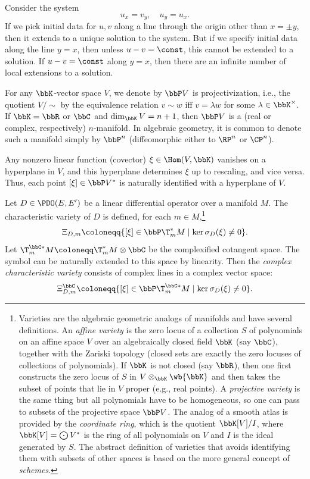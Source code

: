 \begin{example}\label{ex 5.6.1 Ivey}
    Consider the system 
    \[u_x=v_y,\quad u_y=u_x.\label{eq 5.20 Ivey}\]
    If we pick initial data for $u,v$ along a line through the origin other than $x=\pm y$, then it extends to a unique solution to the system. But if we specify initial data along the line $y=x$, then unless $u-v=\const$, this cannot be extended to a solution. If $u-v=\const$ along $y=x$, then there are an infinite number of local extensions to a solution.
\end{example}

For any $\bbK$-vector space $V$, we denote by $\bbP V$ is projectivization, i.e., the quotient $V\slash \sim$ by the equivalence relation $v\sim w$ iff $v=\lambda w$ for some $\lambda\in\bbK^\times$. If $\bbK=\bbR$ or $\bbC$ and $\dim_\bbK V=n+1$, then $\bbP V$ is a (real or complex, respectively) $n$-manifold. In algebraic geometry, it is common to denote such a manifold simply by $\bbP^n$ (diffeomorphic either to $\RP^n$ or $\CP^n$).

Any nonzero linear function (covector) $\xi\in\Hom(V,\bbK)$ vanishes on a hyperplane in $V$, and this hyperplane determines $\xi$ up to rescaling, and vice versa. Thus, each point $[\xi]\in \bbP V^\ast$ is naturally identified with a hyperplane of $V$.

\begin{defn}
    Let $D\in\PDO(E,E')$ be a linear differential operator over a manifold $M$. The characteristic variety of $D$ is defined, for each $m\in M$,\footnote{Varieties are the algebraic geometric analogs of manifolds and have several definitions. An \emph{affine variety} is the zero locus of a collection $S$ of polynomials on an affine space $V$ over an algebraically closed field $\bbK$ (say $\bbC$), together with the Zariski topology (closed sets are exactly the zero locuses of collections of polynomials). If $\bbK$ is not closed (say $\bbR$), then one first constructs the zero locus of $S$ in $V\otimes_{\bbK} \wb{\bbK}$ and then takes the subset of points that lie in $V$ proper (e.g., real points). A \emph{projective variety} is the same thing but all polynomials have to be homogeneous, so one can pass to subsets of the projective space $\bbP V$. The analog of a smooth atlas is provided by the \emph{coordinate ring}, which is the quotient $\bbK[V]\slash I$, where $\bbK[V]=\bigodot V^\ast$ is the ring of all polynomials on $V$ and $I$ is the ideal generated by $S$. The abstract definition of varieties that avoids identifying them with subsets of other spaces is based on the more general concept of \emph{schemes}.}
    \[\Xi_{D,m}\coloneqq \{[\xi]\in \bbP \T^\ast_m M\mid \ker\sigma_D(\xi)\neq 0\}.\]
    Let $\T^{\bbC\ast}_m M\coloneqq \T_m^\ast M\otimes\bbC$ be the complexified cotangent space. The symbol can be naturally extended to this space by linearity. Then the \emph{complex characteristic variety} consists of complex lines in a complex vector space:
    \[\Xi_{D,m}^\bbC\coloneqq \{[\xi]\in \bbP \T^{\bbC\ast}_m M\mid \ker\sigma_D(\xi)\neq 0\}.\]
\end{defn}

